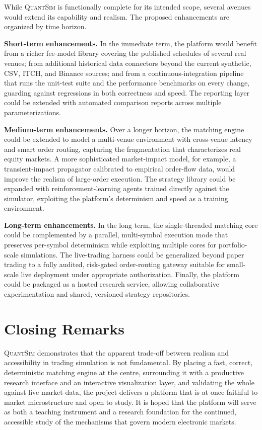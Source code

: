 \documentclass[12pt,oneside,a4paper]{report}
\newcommand{\quantsim}{\textsc{QuantSim}}
\begin{document}
While \quantsim{} is functionally complete for its intended scope, several avenues would extend its capability and realism. The proposed enhancements are organized by time horizon.

\textbf{Short-term enhancements.} In the immediate term, the platform would benefit from a richer fee-model library covering the published schedules of several real venues; from additional historical data connectors beyond the current synthetic, CSV, ITCH, and Binance sources; and from a continuous-integration pipeline that runs the unit-test suite and the performance benchmarks on every change, guarding against regressions in both correctness and speed. The reporting layer could be extended with automated comparison reports across multiple parameterizations.

\textbf{Medium-term enhancements.} Over a longer horizon, the matching engine could be extended to model a multi-venue environment with cross-venue latency and smart order routing, capturing the fragmentation that characterizes real equity markets. A more sophisticated market-impact model, for example, a transient-impact propagator calibrated to empirical order-flow data, would improve the realism of large-order execution. The strategy library could be expanded with reinforcement-learning agents trained directly against the simulator, exploiting the platform's determinism and speed as a training environment.

\textbf{Long-term enhancements.} In the long term, the single-threaded matching core could be complemented by a parallel, multi-symbol execution mode that preserves per-symbol determinism while exploiting multiple cores for portfolio-scale simulations. The live-trading harness could be generalized beyond paper trading to a fully audited, risk-gated order-routing gateway suitable for small-scale live deployment under appropriate authorization. Finally, the platform could be packaged as a hosted research service, allowing collaborative experimentation and shared, versioned strategy repositories.

\section{Closing Remarks}
\label{sec:closing}

\quantsim{} demonstrates that the apparent trade-off between realism and accessibility in trading simulation is not fundamental. By placing a fast, correct, deterministic matching engine at the centre, surrounding it with a productive research interface and an interactive visualization layer, and validating the whole against live market data, the project delivers a platform that is at once faithful to market microstructure and open to study. It is hoped that the platform will serve as both a teaching instrument and a research foundation for the continued, accessible study of the mechanisms that govern modern electronic markets.
\end{document}
